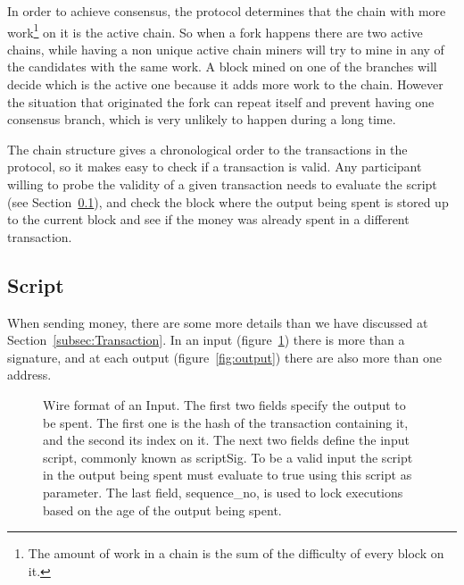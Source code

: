 In order to achieve consensus, the protocol determines that the chain with
  more work\footnote{The amount of work in a chain is the sum of the difficulty
  of every block on it.} on it is the active chain.
So when a fork happens there are two active chains, while having a non unique
  active chain miners will try to mine in any of the candidates with the same
  work.
A block mined on one of the branches will decide which is the active one
  because it adds more work to the chain. However the situation that originated
  the fork can repeat itself and prevent having one consensus branch, which is
  very unlikely \cite{decker2013information} to happen during a long time.

The chain structure gives a chronological order to the transactions in the
  protocol, so it makes easy to check if a transaction is valid.
Any participant willing to probe the validity of a given transaction needs
  to evaluate the script (see Section~\ref{subsec:script}), and  check the block
  where the output being spent is stored up to the current block and see if the
  money was already spent in a different transaction.

  \subsection{Script} \label{subsec:script}

When sending money, there are some more details than we have discussed at
  Section~\ref{subsec:Transaction}. In an input (figure~\ref{fig:input}) there
  is more than a signature, and at each output (figure~\ref{fig:output}) there
  are also more than one address.

\begin{figure}[ht]
  \centering
  
  \caption[Wire format of an Input.]{Wire format of an Input.
             The first two fields specify the output to be spent.
             The first one is the hash of the transaction containing it, and the
               second its index on it.
             The next two fields define the input script, commonly known as
               scriptSig.
             To be a valid input the script in the output being spent must
               evaluate to true using this script as parameter.
             The last field, sequence\_no, is used to lock executions based on
             the age of the output being spent.
         }
  \label{fig:input}
\end{figure}

